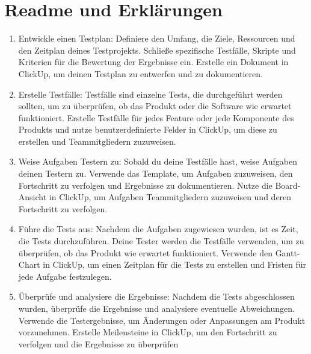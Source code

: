 \section{Readme und Erklärungen}

\begin{enumerate}
	\item Entwickle einen Testplan: Definiere den Umfang, die Ziele, Ressourcen und den Zeitplan deines Testprojekts. Schließe spezifische Testfälle, Skripte und Kriterien für die Bewertung der Ergebnisse ein. Erstelle ein Dokument in ClickUp, um deinen Testplan zu entwerfen und zu dokumentieren.
	\item Erstelle Testfälle: Testfälle sind einzelne Tests, die durchgeführt werden sollten, um zu überprüfen, ob das Produkt oder die Software wie erwartet funktioniert. Erstelle Testfälle für jedes Feature oder jede Komponente des Produkts und nutze benutzerdefinierte Felder in ClickUp, um diese zu erstellen und Teammitgliedern zuzuweisen.
	\item Weise Aufgaben Testern zu: Sobald du deine Testfälle hast, weise Aufgaben deinen Testern zu. Verwende das Template, um Aufgaben zuzuweisen, den Fortschritt zu verfolgen und Ergebnisse zu dokumentieren. Nutze die Board-Ansicht in ClickUp, um Aufgaben Teammitgliedern zuzuweisen und deren Fortschritt zu verfolgen.
	\item Führe die Tests aus: Nachdem die Aufgaben zugewiesen wurden, ist es Zeit, die Tests durchzuführen. Deine Tester werden die Testfälle verwenden, um zu überprüfen, ob das Produkt wie erwartet funktioniert. Verwende den Gantt-Chart in ClickUp, um einen Zeitplan für die Tests zu erstellen und Fristen für jede Aufgabe festzulegen.
	\item Überprüfe und analysiere die Ergebnisse: Nachdem die Tests abgeschlossen wurden, überprüfe die Ergebnisse und analysiere eventuelle Abweichungen. Verwende die Testergebnisse, um Änderungen oder Anpassungen am Produkt vorzunehmen. Erstelle Meilensteine in ClickUp, um den Fortschritt zu verfolgen und die Ergebnisse zu überprüfen
\end{enumerate}
